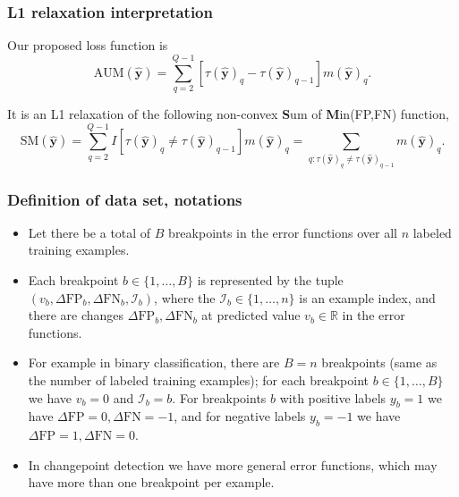 \documentclass{beamer}
\begin{document}
\begin{frame}
  \frametitle{L1 relaxation interpretation}
  
Our proposed loss function is
\begin{equation*}
\label{eq:AUM-computation}
    \text{AUM}(\mathbf {\hat y}) =
    \sum_{q=2}^{Q-1}
    [ \tau(\mathbf {\hat y})_{q} - \tau(\mathbf {\hat y})_{q-1} ]
    m(\mathbf {\hat y})_q.
\end{equation*}

It is an L1 relaxation of the following non-convex \textbf{S}um of \textbf{M}in(FP,FN) function, 
\begin{equation*}
\label{eq:SM-computation}
    \text{SM}(\mathbf {\hat y}) =
    \sum_{q=2}^{Q-1}
    I[ \tau(\mathbf {\hat y})_{q} \neq \tau(\mathbf {\hat y})_{q-1} ]
    m(\mathbf {\hat y})_q =
    \sum_{q:\tau(\mathbf {\hat y})_{q} \neq \tau(\mathbf {\hat y})_{q-1} }
    m(\mathbf {\hat y})_q.
\end{equation*}

\end{frame}

\begin{frame}
  \frametitle{Definition of data set, notations}

  \begin{itemize}
  \item Let there be a total of $B$ breakpoints in the error functions over
    all $n$ labeled training examples.
  \item Each breakpoint
  $b\in\{1,\dots, B\}$ is represented by the tuple
  $(v_b, \Delta\text{FP}_b, \Delta\text{FN}_b, \mathcal I_b)$, where the
  $\mathcal I_b\in\{1,\dots,n\}$ is an example index, and there are
  changes $\Delta\text{FP}_b, \Delta\text{FN}_b$ at predicted value
  $v_b\in\mathbb R$ in the error functions.
\item For example in binary
  classification, there are $B=n$ breakpoints (same as the number of
  labeled training examples); for each breakpoint $b\in\{1,\dots,B\}$
  we have $v_b=0$ and $\mathcal I_b=b$.  For breakpoints $b$ with
  positive labels $y_b=1$ we have
  $\Delta\text{FP}=0,\Delta\text{FN}=-1$, and for negative labels
  $y_b=-1$ we have $\Delta\text{FP}=1,\Delta\text{FN}=0$.  
\item   In
  changepoint detection we have more general error functions, which
  may have more than one breakpoint per example.
  \end{itemize}
  
\end{frame}
\end{document}
